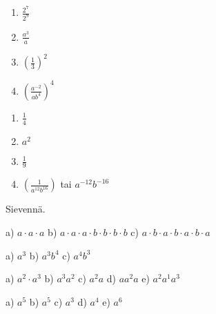     \begin{tehtava}%
        \begin{enumerate}
        	\item $\frac{2^7}{2^9}$ 
        	\item $\frac{a^3}{a}$ 
        	\item $\left(\frac{1}{3}\right)^2$ 
        	\item $\left(\frac{a^{-2}}{ab^4}\right)^4$
		\end{enumerate}        
        \begin{vastaus}
        \begin{enumerate}
            \item $\frac{1}{4}$ 
            \item $a^2$ 
            \item $\frac{1}{9} $ 
            \item $ \left(\frac{1}{a^{12}b^{16}}\right)$ tai $a^{-12}b^{-16}$
        \end{enumerate}
        \end{vastaus}
    \end{tehtava}     
            
        
        
        
    
    Sievennä.
    \begin{tehtava}
        a) $a\cdot a\cdot a$ \quad
        b) $a\cdot a\cdot a\cdot b\cdot b\cdot b\cdot b$ \quad
        c) $a\cdot b\cdot a\cdot b\cdot a\cdot b\cdot a$
        
        \begin{vastaus}
            a) $a^3$ \qquad
            b) $a^3b^4$ \qquad
            c) $a^4b^3$
        \end{vastaus}
    \end{tehtava}
    
    \begin{tehtava}
        a) $a^2\cdot a^3$ \qquad
        b) $a^3a^2$ \qquad
        c) $a^2 a$ \qquad
        d) $a a^2 a$ \qquad
        e) $a^2a^1a^3$
        
        \begin{vastaus}
            a) $a^5$ \qquad
            b) $a^5$ \qquad
            c) $a^3$ \qquad
            d) $a^4$ \qquad
            e) $a^6$
        \end{vastaus}
    \end{tehtava}
    
